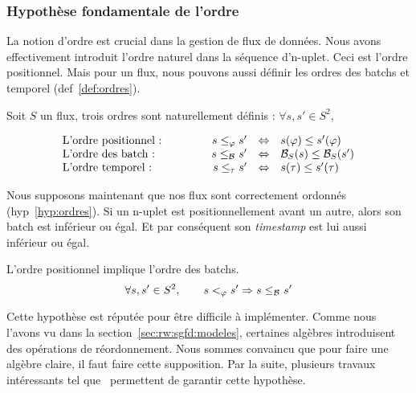 \subsubsection{Hypothèse fondamentale de l'ordre}
La notion d'ordre est crucial dans la gestion de flux de données. Nous avons effectivement introduit l'ordre naturel dans la séquence d'n-uplet. Ceci est l'ordre positionnel. Mais pour un flux, nous pouvons aussi définir les ordres des batchs et temporel (def~\ref{def:ordres}).
\begin{defi}\label{def:ordres}
Soit $S$ un flux, trois ordres sont naturellement définis : $\forall s,s' \in S^2$,

$$\begin{array}{lcrcl} 
\textrm{L'ordre positionnel : } &\qquad & s \leq_\varphi s' & \Leftrightarrow & s(\varphi) \leq s'(\varphi)\\
\textrm{L'ordre des batch : } & & s \leq_{\mathcal{B}_{}} s' &\Leftrightarrow& \mathcal{B}_S(s) \leq \mathcal{B}_S(s')\\
\textrm{L'ordre temporel : } & & s \leq_\tau s' &\Leftrightarrow& s(\tau) \leq s'(\tau)\\
\end{array}$$
\end{defi}

Nous supposons maintenant que nos flux sont correctement ordonnés (hyp~\ref{hyp:ordres}). Si un n-uplet est positionnellement avant un autre, alors son batch est inférieur ou égal. Et par conséquent son \textit{timestamp} est lui aussi inférieur ou égal.
\begin{hyp}\label{hyp:ordres}
L'ordre positionnel implique l'ordre des batchs.
$$\forall s, s'\in S^2, \qquad s <_\varphi s' \Rightarrow s \leq_{\mathcal{B}_{}} s'$$
\end{hyp}
Cette hypothèse est réputée pour être difficile à implémenter. Comme nous l'avons vu dans la section~\ref{sec:rw:sgfd:modeles}, certaines algèbres introduisent des opérations de réordonnement. Nous sommes convaincu que pour faire une algèbre claire, il faut faire cette supposition. Par la suite, plusieurs travaux intéressants tel que~\cite{Krishnamurthy:discontinuous} permettent de garantir cette hypothèse.

